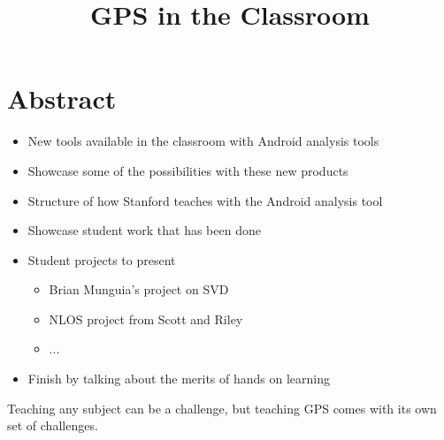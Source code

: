 \documentclass[conference]{IEEEtran}
\begin{document}
\title{GPS in the Classroom}

\author{
\and
{}
\and
{}
\and
{}
}

\maketitle

\section*{Abstract}

\begin{itemize}
    \item New tools available in the classroom with Android analysis tools
    \item Showcase some of the possibilities with these new products
    \item Structure of how Stanford teaches with the Android analysis tool
    \item Showcase student work that has been done 
    \item Student projects to present
    \begin{itemize}
        \item Brian Munguia's project on SVD
        \item NLOS project from Scott and Riley
        \item ...
    \end{itemize}
    \item Finish by talking about the merits of hands on learning
\end{itemize}

Teaching any subject can be a challenge, but teaching GPS comes with its own set of challenges.
\end{document}

